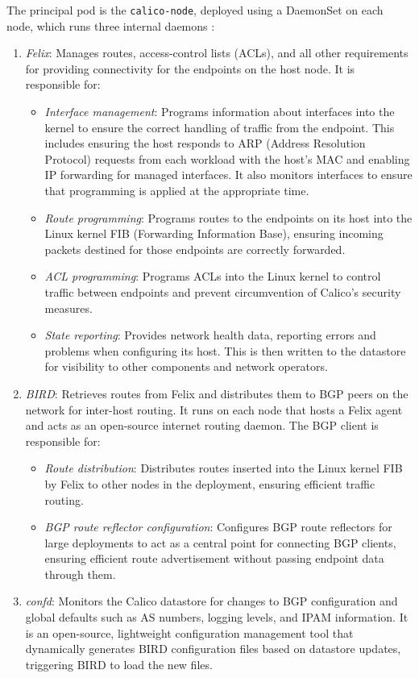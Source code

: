 The principal pod is the \texttt{calico-node}, deployed using a DaemonSet on
each node, which runs three internal daemons \cite{calicodoc}:

\begin{enumerate}
  \itemsep0em
  \item \textit{Felix}: Manages routes, access-control lists (ACLs), and all
    other requirements for providing connectivity for the endpoints on the host
    node. It is responsible for:
    \begin{itemize}
      \itemsep0em
      \item \textit{Interface management}: Programs information about interfaces
        into the kernel to ensure the correct handling of traffic from the
        endpoint. This includes ensuring the host responds to ARP (Address
        Resolution Protocol) requests from each workload with the host's MAC and
        enabling IP forwarding for managed interfaces.
        It also monitors interfaces to ensure that programming is applied at the
        appropriate time.
      \item \textit{Route programming}: Programs routes to the endpoints on its
        host into the Linux kernel FIB (Forwarding Information Base), ensuring
        incoming packets destined for those endpoints are correctly forwarded.
      \item \textit{ACL programming}: Programs ACLs into the Linux kernel to
        control traffic between endpoints and prevent circumvention of Calico's
        security measures.
      \item \textit{State reporting}: Provides network health data, reporting
        errors and problems when configuring its host. This is then written to
        the datastore for visibility to other components and network operators.
    \end{itemize}
  \item \textit{BIRD}: Retrieves routes from Felix and distributes them to BGP
    peers on the network for inter-host routing. It runs on each node that hosts
    a Felix agent and acts as an open-source internet routing daemon. The BGP
    client is responsible for:
    \begin{itemize}
      \itemsep0em
      \item \textit{Route distribution}: Distributes routes inserted into the
        Linux kernel FIB by Felix to other nodes in the deployment, ensuring
        efficient traffic routing.
      \item \textit{BGP route reflector configuration}: Configures BGP route
        reflectors for large deployments to act as a central point for
        connecting BGP clients, ensuring efficient route advertisement without
        passing endpoint data through them.
    \end{itemize}
  \item \textit{confd}: Monitors the Calico datastore for changes to BGP
    configuration and global defaults such as AS numbers, logging levels, and
    IPAM information. It is an open-source, lightweight configuration
    management tool that dynamically generates BIRD configuration files based on
    datastore updates, triggering BIRD to load the new files.
\end{enumerate}

